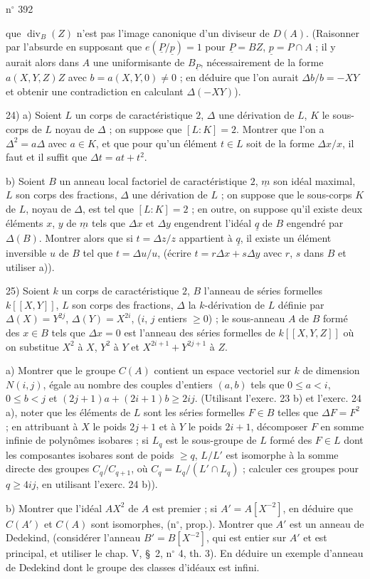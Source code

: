 \hfill n$^{\circ}$ 392

que $\operatorname{div}_{B}(Z)$ n'est pas l'image canonique d'un diviseur de $D(A)$. (Raisonner par l'absurde en supposant que $e(\underline{P}/\underline{p})=1$ pour $\underline{P}=BZ$, $\underline{p}=P\cap A$ ; il y aurait alors dans $A$ une uniformisante de $B_{\underline{P}}$, nécessairement de la forme $a(X,Y,Z)Z$ avec $b=a(X,Y,0)\ne 0$ ; en déduire que l'on aurait $\Delta b/b=-XY$ et obtenir une contradiction en calculant $\Delta(-XY)$).

24) \qquad a) Soient $L$ un corps de caractéristique $2$, $\Delta$ une dérivation de $L$, $K$ le sous-corps de $L$ noyau de $\Delta$ ; on suppose que $[L:K]=2$. Montrer que l'on a $\Delta^2=a\Delta$ avec $a\in K$, et que pour qu'un élément $t\in L$ soit de la forme $\Delta x/x$, il faut et il suffit que $\Delta t=at+t^2$.

b) Soient $B$ un anneau local factoriel de caractéristique $2$, $\underline{m}$ son idéal maximal, $L$ son corps des fractions, $\Delta$ une dérivation de $L$ ; on suppose que le sous-corps $K$ de $L$, noyau de $\Delta$, est tel que $[L:K]=2$ ; en outre, on suppose qu'il existe deux éléments $x$, $y$ de $\underline{m}$ tels que $\Delta x$ et $\Delta y$ engendrent l'idéal $\underline{q}$ de $B$ engendré par $\Delta(B)$. Montrer alors que si $t=\Delta z/z$ appartient à $\underline{q}$, il existe un élément inversible $u$ de $B$ tel que $t=\Delta u/u$, (écrire $t=r\Delta x+s\Delta y$ avec $r$, $s$ dans $B$ et utiliser a)).

25) Soient $k$ un corps de caractéristique $2$, $B$ l'anneau de séries formelles $k[[X,Y]]$, $L$ son corps des fractions, $\Delta$ la $k$-dérivation de $L$ définie par $\Delta(X)=Y^{2j}$, $\Delta(Y)=X^{2i}$, ($i$, $j$ entiers $\geq 0$) ; le sous-anneau $A$ de $B$ formé des $x\in B$ tels que $\Delta x=0$ est l'anneau des séries formelles de $k[[X,Y,Z]]$ où on substitue $X^2$ à $X$, $Y^2$ à $Y$ et $X^{2i+1}+Y^{2j+1}$ à $Z$.

a) Montrer que le groupe $C(A)$ contient un espace vectoriel sur $k$ de dimension $N(i,j)$, égale au nombre des couples d'entiers $(a,b)$ tels que $0\leq a<i$, $0\leq b<j$ et $(2j+1)a+(2i+1)b\geq 2ij$. (Utilisant l'exerc. 23 b) et l'exerc. 24 a), noter que les éléments de $L$ sont les séries formelles $F\in B$ telles que $\Delta F=F^2$ ; en attribuant à $X$ le poids $2j+1$ et à $Y$ le poids $2i+1$, décomposer $F$ en somme infinie de polynômes isobares ; si $L_q$ est le sous-groupe de $L$ formé des $F\in L$ dont les composantes isobares sont de poids $\geq q$, $L/L'$ est isomorphe à la somme directe des groupes $C_q/C_{q+1}$, où $C_q=L_q/(L'\cap L_q)$ ; calculer ces groupes pour $q\geq 4ij$, en utilisant l'exerc. 24 b)).

b) Montrer que l'idéal $AX^2$ de $A$ est premier ; si $A'=A[X^{-2}]$, en déduire que $C(A')$ et $C(A)$ sont isomorphes, (n$^{\circ}$\qquad, prop.\qquad). Montrer que $A'$ est un anneau de Dedekind, (considérer l'anneau $B'=B[X^{-2}]$, qui est entier sur $A'$ et est principal, et utiliser le chap. V, \S~2, n$^{\circ}$ 4, th. 3). En déduire un exemple d'anneau de Dedekind dont le groupe des classes d'idéaux est infini.
